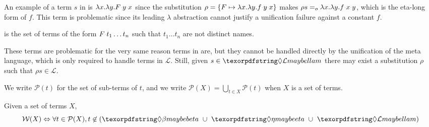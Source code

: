 \documentclass[sigconf,natbib=false,review]{acmart}
\newcommand{\appsep}{\ensuremath{\textcolor{lightgray}{\cdot}}}
\newcommand{\EqualRel}{\ensuremath{=}}
\newcommand{\Eo}{\ensuremath{\EqualRel_o}\xspace}
\newcommand{\llambda}{\ensuremath{\mathcal{L}}\xspace}
\newcommand{\Ho}{\texorpdfstring{\ensuremath{\mathcal{M}}\xspace}{M}}
\begin{document}
\noindent
An example of a term $s$ in \maybeeta{} is
$\lambda x.\lambda y.F \appsep y \appsep x$
since the substitution
$\rho = \{ F \mapsto \lambda x.\lambda y.f \appsep y \appsep x\}$
makes $\rho s \Eo{} \lambda x.\lambda y.f \appsep x \appsep y$,
which is the eta-long form of $f$. This term is problematic since
its leading $\lambda$ abstraction cannot justify a
unification failure against a constant $f$.

\begin{definition}[\notllambda]\label{def:notllambda}
  \notllambda is the set of terms of the form $F \appsep t_1 \ldots t_n$
  such that $t_1 \ldots t_n$ are not distinct names.
\end{definition}

\noindent
These terms are problematic for the very same reason terms in \maybebeta are,
but they cannot be handled directly by the unification of the meta language, which
is only required to handle terms in \llambda. Still, given $s \in \notllambda$
there may exist a substitution $\rho$ such that $\rho s \in \llambda$.


\newcommand{\subterm}[1]{\ensuremath{\mathcal{P}(#1)}}
We write $\subterm{t}$ for the set of sub-terms of $t$, and
we write $\subterm{X} = \bigcup_{t\in X} \subterm{t}$ when $X$ is a set of terms.

\newcommand{\wellb}{\ensuremath{\mathcal{W}}\xspace}
\begin{definition}
Given a set of terms $X$, %
$$
\wellb(X) \Leftrightarrow \forall t \in \subterm{X},
t \not\in (\maybebeta{} ~\cup~ \maybeeta{} ~\cup~ \notllambda{})
$$
\end{definition}
\end{document}
